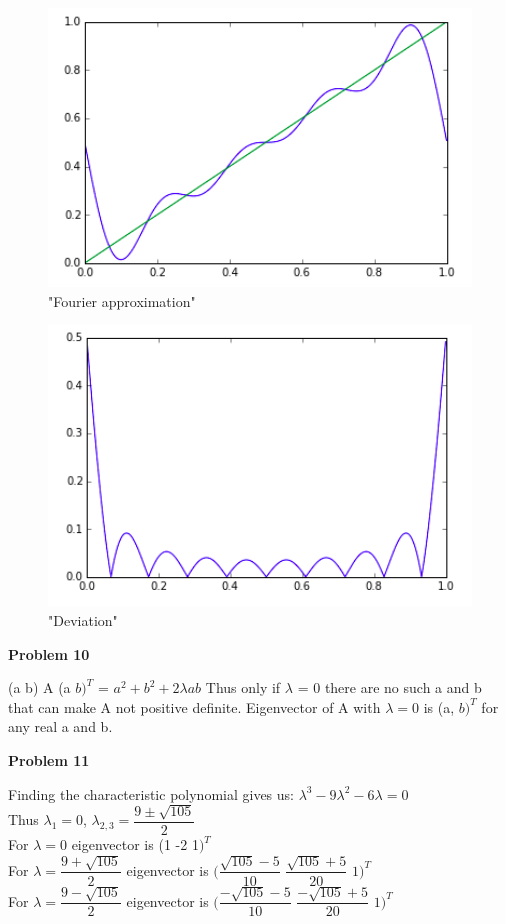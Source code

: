 \documentclass[12pt]{article}
\begin{document}
      \begin{figure}[H]
      	\centering
      	\includegraphics[width=15cm]{3}
      	\caption{"Fourier approximation"}
      \end{figure}
      
      \begin{figure}[H]
      	\centering
      	\includegraphics[width=15cm]{4}
      	\caption{"Deviation"}
      \end{figure}
    
    \textbf{Problem 10}
    
    (a b) A (a $b)^T$ = $a^2 + b^2 + 2 \lambda ab$
    Thus only if $\lambda$ = 0 there are no such a and b that can make A not positive definite.
    Eigenvector of A with $\lambda = 0$ is (a, $b)^T$ for any real a and b. 
    
    \textbf{Problem 11}
    
    Finding the characteristic polynomial gives us: $\lambda^3 - 9 \lambda^2 - 6\lambda = 0$\\
    Thus $\lambda_1 = 0$, $\lambda_{2,3} = \dfrac{9 \pm \sqrt{105}}{2}$\\
    For $\lambda = 0$ eigenvector is (1 -2 1$)^T$\\
    For $\lambda = \dfrac{9 + \sqrt{105}}{2}$ eigenvector is $(\dfrac{\sqrt{105} - 5}{10}$ $\dfrac{\sqrt{105} + 5}{20}$ $1)^T$\\
    For $\lambda = \dfrac{9 - \sqrt{105}}{2}$ eigenvector is $(\dfrac{-\sqrt{105} - 5}{10}$ $\dfrac{-\sqrt{105} + 5}{20}$ $1)^T$\\
        
\end{document}
